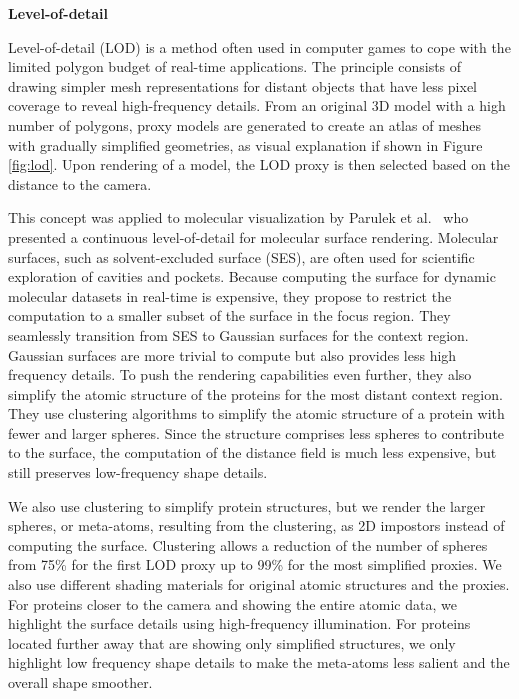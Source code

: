 \textbf{Level-of-detail}

Level-of-detail (LOD) is a method often used in computer games to cope with the limited polygon budget of real-time applications.
The principle consists of drawing simpler mesh representations for distant objects that have less pixel coverage to reveal high-frequency details. 
From an original 3D model with a high number of polygons, proxy models are generated to create an atlas of meshes with gradually simplified geometries, as visual explanation if shown in Figure \ref{fig:lod}.
Upon rendering of a model, the LOD proxy is then selected based on the distance to the camera.

This concept was applied to molecular visualization by Parulek et al.~\cite{parulek2014continuous} who presented a continuous level-of-detail for molecular surface rendering.
Molecular surfaces, such as solvent-excluded surface (SES), are often used for scientific exploration of cavities and pockets.
Because computing the surface for dynamic molecular datasets in real-time is expensive, they propose to restrict the computation to a smaller subset of the surface in the focus region.
They seamlessly transition from SES to Gaussian surfaces for the context region.
Gaussian surfaces are more trivial to compute but also provides less high frequency details.
To push the rendering capabilities even further, they also simplify the atomic structure of the proteins for the most distant context region.
They use clustering algorithms to simplify the atomic structure of a protein with fewer and larger spheres.
Since the structure comprises less spheres to contribute to the surface, the computation of the distance field is much less expensive, but still preserves low-frequency shape details.

We also use clustering to simplify protein structures, but we render the larger spheres, or meta-atoms, resulting from the clustering, as 2D impostors instead of computing the surface.
Clustering allows a reduction of the number of spheres from 75\% for the first LOD proxy up to 99\% for the most simplified proxies.
We also use different shading materials for original atomic structures and the proxies.
For proteins closer to the camera and showing the entire atomic data, we highlight the surface details using high-frequency illumination.
For proteins located further away that are showing only simplified structures, we only highlight low frequency shape details to make the meta-atoms less salient and the overall shape smoother.

